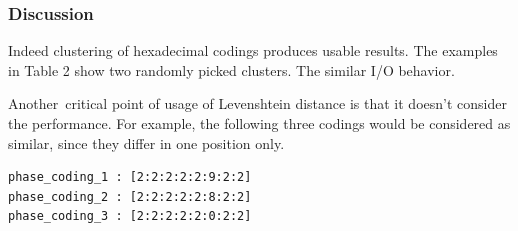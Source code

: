 \documentclass[]{llncs}
\begin{document}
\subsubsection{Discussion}
Indeed clustering of hexadecimal codings produces usable results.
The examples in Table 2 show two randomly picked clusters.
The similar I/O behavior.

Another\ critical point of usage of Levenshtein distance is that it doesn't consider the performance.
For example, the following three codings would be considered as similar, since they differ in one position only.

\begin{lstlisting}
phase_coding_1 : [2:2:2:2:2:9:2:2]
phase_coding_2 : [2:2:2:2:2:8:2:2]
phase_coding_3 : [2:2:2:2:2:0:2:2]
\end{lstlisting}
\end{document}
